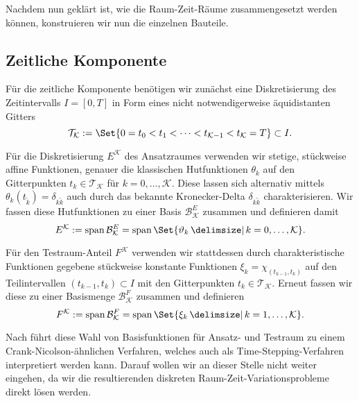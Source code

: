 \documentclass[../main.tex]{subfiles}
\begin{document}
Nachdem nun geklärt ist, wie die Raum-Zeit-Räume zusammengesetzt werden können, konstruieren wir nun die einzelnen Bauteile.

\subsection*{Zeitliche Komponente}

Für die zeitliche Komponente benötigen wir zunächst eine Diskretisierung des Zeitintervalls $I = [0, T]$ in Form eines nicht notwendigerweise äquidistanten Gitters
\begin{equation}
\label{eq:zeitgitter}
    \mathcal T_{\mathcal K} := \Set{0 = t_0 < t_1 < \dots < t_{\mathcal K - 1} < t_{\mathcal K} = T} \subset I.
\end{equation}

Für die Diskretisierung $E^{\mathcal K}$ des Ansatzraumes verwenden wir stetige, stückweise affine Funktionen, genauer die klassischen Hutfunktionen $\theta_{k}$ auf den Gitterpunkten $t_{k} \in \mathcal T_{\mathcal K}$ für $k = 0, \dots, \mathcal K$.
Diese lassen sich alternativ mittels $\theta_{k}(t_{\tilde{k}}) = \delta_{k \tilde k}$ auch durch das bekannte Kronecker-Delta $\delta_{k \tilde k}$ charakterisieren.
Wir fassen diese Hutfunktionen zu einer Basis $\mathcal B^{E}_{\mathcal K}$ zusammen und definieren damit
\begin{equation}
    \label{eq:zeitanteil_ansatzraum}
    E^{\mathcal K} := \spn \mathcal B^{E}_{\mathcal K} = \spn \Set{ \theta_{k} \given k = 0, \dots, \mathcal K }.
\end{equation}

Für den Testraum-Anteil $F^{\mathcal K}$ verwenden wir stattdessen durch charakteristische Funktionen gegebene stückweise konstante Funktionen $\xi_{k} = \chi_{(t_{k-1}, t_{k})}$ auf den Teilintervallen $(t_{k - 1}, t_{k}) \subset I$ mit den Gitterpunkten $t_{k} \in \mathcal T_{\mathcal K}$.
Erneut fassen wir diese zu einer Basismenge $\mathcal B^{F}_{\mathcal K}$ zusammen und definieren
\begin{equation}
    \label{eq:zeitanteil_testraum}
    F^{\mathcal K} := \spn \mathcal B^{F}_{\mathcal K} = \spn \Set{ \xi_{k} \given k = 1, \dots, \mathcal K}.
\end{equation}

Nach \cite{Andreev:2012ep} führt diese Wahl von Basisfunktionen für Ansatz- und Testraum zu einem Crank-Nicolson-ähnlichen Verfahren, welches auch als Time-Stepping-Verfahren interpretiert werden kann.
Darauf wollen wir an dieser Stelle nicht weiter eingehen, da wir die resultierenden diskreten Raum-Zeit-Variationsprobleme direkt lösen werden.
\end{document}
